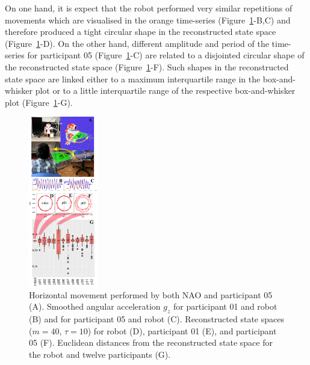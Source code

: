 \documentclass{sig-alternate-05-2015}
\begin{document}
% 


On one hand, it is expect that the robot performed very similar repetitions of movements 
which are visualised in the orange time-series (Figure~\ref{fig:main}-B,C)
and therefore produced a tight circular shape in the reconstructed state space (Figure~\ref{fig:main}-D).
On the other hand, 
different amplitude and period of the time-series for participant 05 (Figure~\ref{fig:main}-C)
are related to a disjointed circular shape of the reconstructed state space (Figure~\ref{fig:main}-F).
Such shapes in the reconstructed state space 
are linked either 
to a maximum interquartile range in the  box-and-whisker plot 
or 
to a little interquartile range of the respective box-and-whisker plot (Figure~\ref{fig:main}-G).







\begin{figure}[ht]
\centering
\includegraphics[width=0.27\textwidth]{fig06}
\caption{
Horizontal movement performed by both NAO and participant 05 (A). 
Smoothed angular acceleration $g_z$ for participant 01  and robot (B)
and for participant 05 and robot (C).
Reconstructed state spaces  ($m=40$, $\tau=10$) for robot (D), participant 01 (E), and participant 05 (F).
Euclidean distances from the reconstructed state space for the robot and twelve participants (G).
}
\label{fig:main}
\end{figure}
\end{document}
